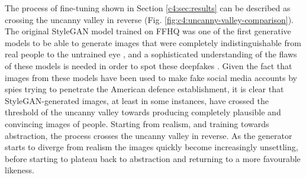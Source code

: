 The process of fine-tuning shown in Section \ref{c4:sec:results} can be described as crossing the uncanny valley in reverse  (Fig. \ref{fig:c4:uncanny-valley-comparison}).
The original StyleGAN model trained on FFHQ was one of the first generative models to be able to generate images that were completely indistinguishable from real people to the untrained eye \citep{ajder2019state}, and a sophisticated understanding of the flaws of these models is needed in order to spot these deepfakes \citep{mcdonald2018how}. 
Given the fact that images from these models have been used to make fake social media accounts \citep{satter2019spy} by spies trying to penetrate the American defence establishment, it is clear that StyleGAN-generated images, at least in some instances, have crossed the threshold of the uncanny valley towards producing completely plausible and convincing images of people.
Starting from realism, and training towards abstraction, the process crosses the uncanny valley in reverse. 
As the generator starts to diverge from realism the images quickly become increasingly unsettling, before starting to plateau back to abstraction and returning to a more favourable likeness.

